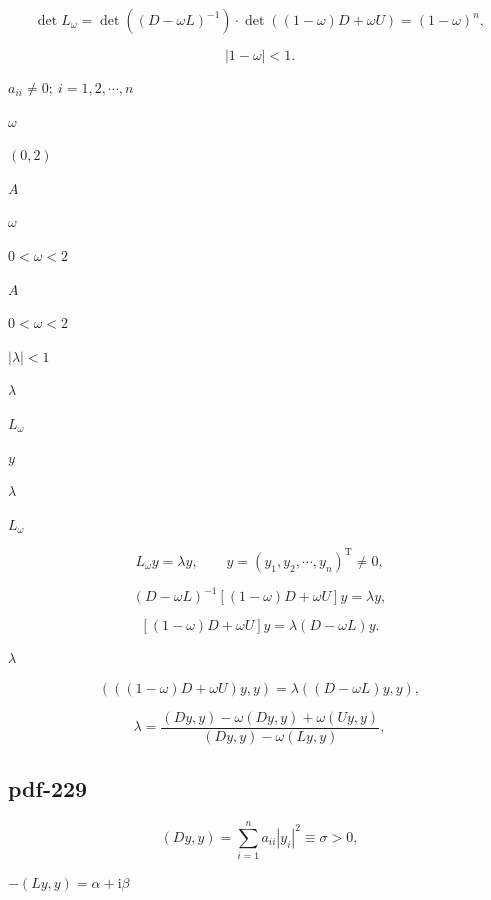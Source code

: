 \documentclass[UTF8,fontset=fandol]{ctexart}
\begin{document}
\[
\det L_\omega=\det((D-\omega L)^{-1})\cdot\det((1-\omega)D+\omega U)=(1-\omega)^n,
\]

\[
|1-\omega|<1.
\]

$a_{ii}\neq0;\ i=1,2,\cdots,n$\par

$\omega$\par

$(0,2)$\par

$A$\par

$\omega$\par

$0<\omega<2$\par

$A$\par

$0<\omega<2$\par

$|\lambda|<1$\par

$\lambda$\par

$L_\omega$\par

$y$\par

$\lambda$\par

$L_\omega$\par

\[
L_\omega y=\lambda y,\qquad y=(y_1,y_2,\cdots,y_n)^{\mathrm T}\neq0,
\]

\[
(D-\omega L)^{-1}[(1-\omega)D+\omega U]y=\lambda y,
\]

\[
[(1-\omega)D+\omega U]y=\lambda(D-\omega L)y.
\]

$\lambda$\par

\[
(((1-\omega)D+\omega U)y,y)=\lambda((D-\omega L)y,y),
\]

\[
\lambda=\frac{(Dy,y)-\omega(Dy,y)+\omega(Uy,y)}{(Dy,y)-\omega(Ly,y)},
\]

\subsection*{pdf-229}

\[
(Dy,y)=\sum_{i=1}^n a_{ii}|y_i|^2\equiv\sigma>0,
\tag{8.4.9}
\]

$-(Ly,y)=\alpha+\mathrm i\beta$\par
\end{document}
